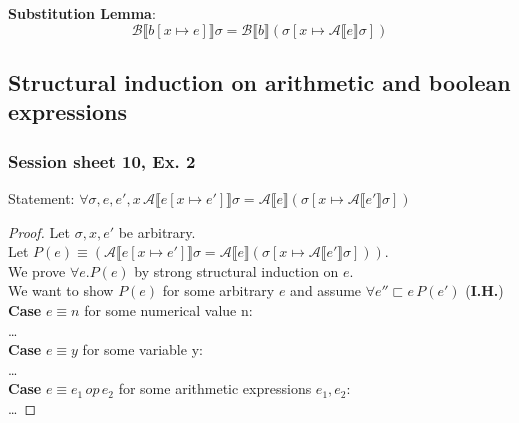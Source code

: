 \documentclass{article}
\def\A{\mathcal{A}}
\def\B{\mathcal{B}}
\def\llb{\llbracket}
\def\rrb{\rrbracket}
\begin{document}
\textbf{Substitution Lemma}:
$$ \B \llb b [x \mapsto e]\rrb \sigma = \B \llb b\rrb (\sigma[x \mapsto \A \llb e \rrb \sigma])$$

\subsection{Structural induction on arithmetic and boolean expressions}
\subsubsection{Session sheet 10, Ex. 2}
Statement: $ \forall \sigma, e, e', x \, \A \llb e [x \mapsto e']\rrb \sigma = \A \llb e \rrb (\sigma[x \mapsto \A \llb e' \rrb \sigma])$
\begin{proof}
    Let $\sigma, x, e'$ be arbitrary. \\
    Let $P(e) \equiv (\A \llb e [x \mapsto e']\rrb \sigma = \A \llb e \rrb (\sigma[x \mapsto \A \llb e' \rrb \sigma]))$.\\
    We prove $\forall e. P(e)$ by strong structural induction on $e$. \\
    We want to show $P(e)$ for some arbitrary $e$ and assume $\forall e''  \sqsubset e \, P(e')$ (\textbf{I.H.})\\
    \textbf{Case} $e \equiv n$ for some numerical value n:\\
    \dots \\
    \textbf{Case} $e \equiv y$ for some variable y:\\
    \dots \\
    \textbf{Case} $e \equiv e_1 \, op \, e_2$ for some arithmetic expressions $e_1, e_2$:\\
    \dots 
\end{proof}
\end{document}
